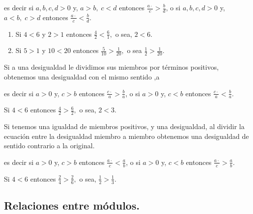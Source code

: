 es decir si $a,b,c,d>0$ y, $a>b,\;c<d$ entonces $\frac{a\cdot}{c}>\frac{b}{d}$,
o si $a,b,c,d>0$ y, $a<b,\;c>d$ entonces $\frac{a\cdot}{c}<\frac{b}{d}$.

\begin{ejemplos}
\begin{enumerate}
\item Si $4<6$ y $2>1$ entonces $\frac{4}{2}<\frac{6}{1},$ o sea, $2<6.$
\item Si $5>1$ y $10<20$ entonces $\frac{5}{10}>\frac{1}{20},$ o sea
$\frac{1}{2}>\frac{1}{20}$.
\end{enumerate}
\end{ejemplos}

\begin{ley}{}

Si a una desigualdad le dividimos sus miembros por términos positivos,
obtenemos una desigualdad con el mismo sentido ,a

\end{ley}

es decir si $a>0$ y, $c>b$ entonces $\frac{c\cdot}{a}>\frac{b}{a}$,
o si $a>0$ y, $c<b$ entonces $\frac{c\cdot}{a}<\frac{b}{a}$.

\begin{ejemplo}

Si $4<6$ entonces $\frac{4}{2}>\frac{6}{2},$ o sea, $2<3.$

\end{ejemplo}

\begin{ley}{}

Si tenemos una igualdad de miembros positivos, y una desigualdad,
al dividir la ecuación entre la desigualdad miembro a miembro obtenemos
una desigualdad de sentido contrario a la original.

\end{ley}

es decir si $a>0$ y, $c>b$ entonces $\frac{a\cdot}{c}<\frac{a}{b}$,
o si $a>0$ y, $c<b$ entonces $\frac{a\cdot}{c}>\frac{a}{b}$.

\begin{ejemplo}

Si $4<6$ entonces $\frac{2}{4}>\frac{2}{6},$ o sea, $\frac{1}{2}>\frac{1}{3}.$

\end{ejemplo}

\subsection{Relaciones entre módulos.}

